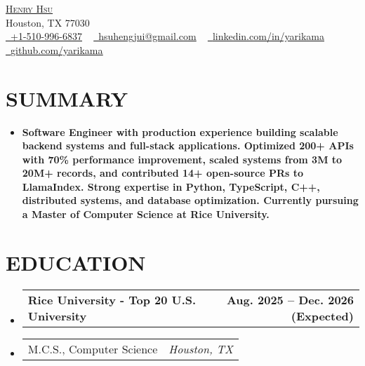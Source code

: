 \documentclass[letterpaper,11pt]{article}
\makeatletter
\newcommand{\mylocation}{
  Houston, TX 77030
}
\newcommand{\resumeSubheadingnull}[2]{
  \item
    \begin{tabular*}{1.0\textwidth}[t]{l@{\extracolsep{\fill}}r}
      \textbf{#1} & \textbf{\small #2} \\
    \end{tabular*}\vspace{3pt}
}
\newcommand{\resumeSubItema}[2]{
  \item
    \begin{tabular*}{1.0\textwidth}[t]{l@{\extracolsep{\fill}}r}
      \small#1 & \textit{\small #2} \\
    \end{tabular*}
}
\newcommand{\resumeSubHeadingListStart}{\begin{itemize}[leftmargin=0.0in, label={}]}
\newcommand{\resumeSubHeadingListEnd}{\end{itemize}}
\makeatother
\begin{document}

\begin{center}
	{\Huge \scshape \href{https://yarikama.world}{Henry Hsu}} \\
    {\small\color{gray} \mylocation} \\
	\href{tel:+1-510-996-6837}{\raisebox{-0.2\height}\faPhone\  \underline{+1-510-996-6837}} ~
	\href{mailto:hsuhengjui@gmail.com}{\raisebox{-0.2\height}\faEnvelope\  \underline{hsuhengjui@gmail.com}} ~
	\href{https://linkedin.com/in/yarikama/}{\raisebox{-0.2\height}\faLinkedin\ \underline{linkedin.com/in/yarikama}}  ~
	\href{https://github.com/yarikama}{\raisebox{-0.2\height}\faGithub\ \underline{github.com/yarikama}}
	\vspace{-8pt}
\end{center}

\section{SUMMARY}
\resumeSubHeadingListStart
\item\small{\textbf{Software Engineer with production experience building scalable backend systems and full-stack applications. Optimized 200+ APIs with 70\% performance improvement, scaled systems from 3M to 20M+ records, and contributed 14+ open-source PRs to LlamaIndex. Strong expertise in Python, TypeScript, C++, distributed systems, and database optimization. Currently pursuing a Master of Computer Science at Rice University.}}
\vspace{-2pt}
\resumeSubHeadingListEnd


\section{EDUCATION}
\resumeSubHeadingListStart
\resumeSubheadingnull
{Rice University - Top 20 U.S. University}{Aug. 2025 -- Dec. 2026 (Expected)}{}{}
\vspace{-20pt}
\resumeSubItema{M.C.S., Computer Science}{Houston, TX}
\vspace{-17pt}
\resumeSubHeadingListEnd
\end{document}
